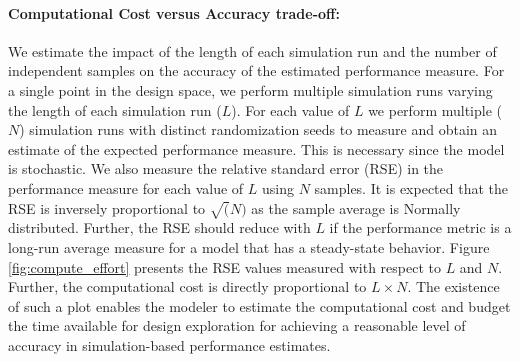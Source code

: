 \paragraph{Computational Cost versus Accuracy trade-off:}
We estimate the impact of the length of each simulation run and the number of independent samples on the accuracy of the estimated performance measure. For a single point in the design space, we perform multiple simulation runs varying the length of each simulation run ($L$). For each value of $L$ we perform multiple ($N$) simulation runs with distinct randomization seeds to measure and obtain an estimate of the expected performance measure. This is necessary since the model is stochastic. We also measure the relative standard error (RSE) in the performance measure for each value of $L$ using $N$ samples. It is expected that the RSE is inversely proportional to $\sqrt(N)$ as the sample average is Normally distributed. Further, the RSE should reduce with $L$ if the performance metric is a long-run average measure for a model that has a steady-state behavior. Figure \ref{fig:compute_effort} presents the RSE values measured with respect to $L$ and $N$. Further, the computational cost is directly proportional to $L\times N$. The existence of such a plot enables the modeler to estimate the computational cost and budget the time available for design exploration for achieving a reasonable level of accuracy in simulation-based performance estimates.
